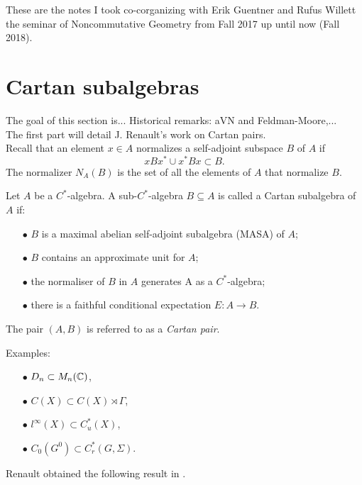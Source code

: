 These are the notes I took co-corganizing with Erik Guentner and Rufus Willett the seminar of Noncommutative Geometry from Fall 2017 up until now (Fall 2018).

\section{Cartan subalgebras}

The goal of this section is... Historical remarks: aVN and Feldman-Moore,...\\

The first part will detail J. Renault's work \cite{RenaultCartan} on Cartan pairs.\\

Recall that an element $x\in A$ normalizes a self-adjoint subspace $B$ of $A$ if 
\[xBx^* \cup x^* B x \subset B.\] 
The normalizer $N_A(B)$ is the set of all the elements of $A$ that normalize $B$.\\ 

\begin{definition}
Let $A$ be a $C^*$-algebra. A sub-$C^*$-algebra $B\subseteq A$ is called a Cartan subalgebra of $A$ if:
\begin{itemize}
\item[$\bullet$] $B$ is a maximal abelian self-adjoint subalgebra (MASA) of $A$;
\item[$\bullet$] $B$ contains an approximate unit for $A$;
\item[$\bullet$] the normaliser of $B$ in $A$ generates A as a $C^*$-algebra;
\item[$\bullet$] there is a faithful conditional expectation $E : A \rightarrow B$.
\end{itemize}
The pair $(A,B)$ is referred to as a \textit{Cartan pair}.
\end{definition}

Examples: 
\begin{itemize}
\item[$\bullet$] $D_n \subset M_n(\mathbb C)$,
\item[$\bullet$] $C(X) \subset C(X)\rtimes \Gamma$,
\item[$\bullet$] $l^\infty(X) \subset C_u^*(X)$,
\item[$\bullet$] $C_0(G^0)\subset C^*_r(G,\Sigma)$.
\end{itemize}

Renault obtained the following result in \cite{RenaultCartan}.

